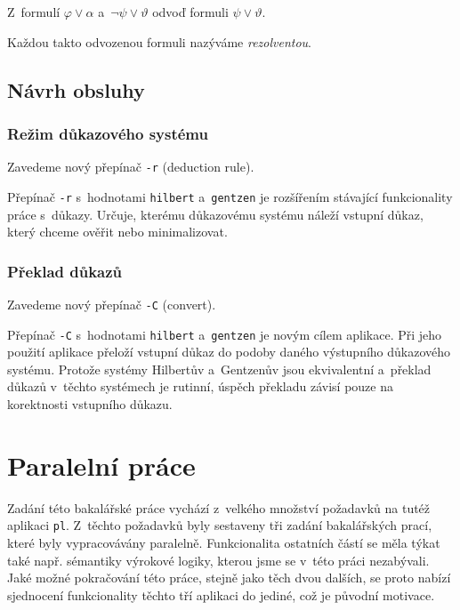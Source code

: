 \documentclass[thesis=B,czech,hidelinks]{thesis}[2012/06/26]
\begin{document}
\begin{dfn}
Z~formulí $\varphi \vee \alpha$ a~$\neg \psi \vee \vartheta$ odvoď formuli $\psi \vee \vartheta$.
\end{dfn}

Každou takto odvozenou formuli nazýváme \emph{rezolventou}.

\subsection{Návrh obsluhy}

\subsubsection{Režim důkazového systému}

Zavedeme nový přepínač \texttt{-r} (deduction rule).

Přepínač \texttt{-r} s~hodnotami \texttt{hilbert} a~\texttt{gentzen} je rozšířením stávající funkcionality práce s~důkazy. Určuje, kterému důkazovému systému náleží vstupní důkaz, který chceme ověřit nebo minimalizovat.

\subsubsection{Překlad důkazů}

Zavedeme nový přepínač \texttt{-C} (convert).

Přepínač \texttt{-C} s~hodnotami \texttt{hilbert} a~\texttt{gentzen} je novým cílem aplikace. Při jeho použití aplikace přeloží vstupní důkaz do podoby daného výstupního důkazového systému. Protože systémy Hilbertův a~Gentzenův jsou ekvivalentní\cite{stary} a~překlad důkazů v~těchto systémech je rutinní\cite{sochor}, úspěch překladu závisí pouze na korektnosti vstupního důkazu.

\section{Paralelní práce}

Zadání této bakalářské práce vychází z~velkého množství požadavků na tutéž aplikaci \texttt{pl}. Z~těchto požadavků byly sestaveny tři zadání bakalářských prací, které byly vypracovávány paralelně. Funkcionalita ostatních částí se měla týkat také např. sémantiky výrokové logiky, kterou jsme se v~této práci nezabývali. Jaké možné pokračování této práce, stejně jako těch dvou dalších, se proto nabízí sjednocení funkcionality těchto tří aplikaci do jediné, což je původní motivace.
\end{document}
